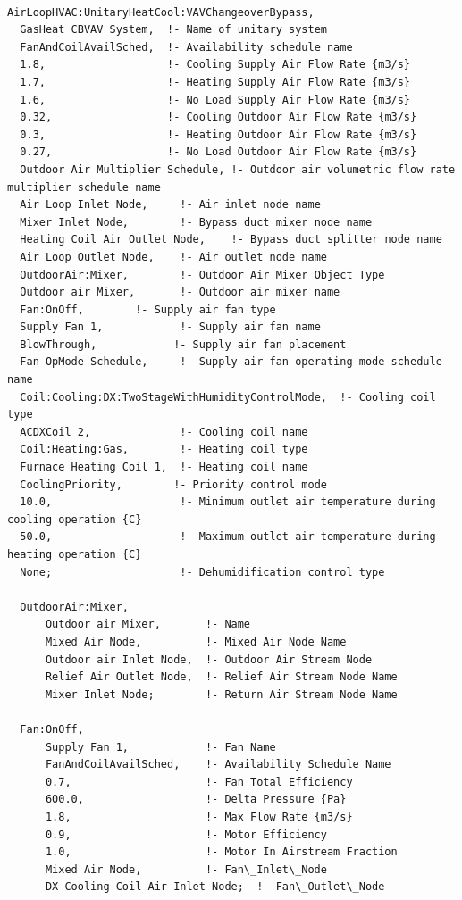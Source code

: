 \begin{lstlisting}

AirLoopHVAC:UnitaryHeatCool:VAVChangeoverBypass,
  GasHeat CBVAV System,  !- Name of unitary system
  FanAndCoilAvailSched,  !- Availability schedule name
  1.8,                   !- Cooling Supply Air Flow Rate {m3/s}
  1.7,                   !- Heating Supply Air Flow Rate {m3/s}
  1.6,                   !- No Load Supply Air Flow Rate {m3/s}
  0.32,                  !- Cooling Outdoor Air Flow Rate {m3/s}
  0.3,                   !- Heating Outdoor Air Flow Rate {m3/s}
  0.27,                  !- No Load Outdoor Air Flow Rate {m3/s}
  Outdoor Air Multiplier Schedule, !- Outdoor air volumetric flow rate multiplier schedule name
  Air Loop Inlet Node,     !- Air inlet node name
  Mixer Inlet Node,        !- Bypass duct mixer node name
  Heating Coil Air Outlet Node,    !- Bypass duct splitter node name
  Air Loop Outlet Node,    !- Air outlet node name
  OutdoorAir:Mixer,        !- Outdoor Air Mixer Object Type
  Outdoor air Mixer,       !- Outdoor air mixer name
  Fan:OnOff,        !- Supply air fan type
  Supply Fan 1,            !- Supply air fan name
  BlowThrough,            !- Supply air fan placement
  Fan OpMode Schedule,     !- Supply air fan operating mode schedule name
  Coil:Cooling:DX:TwoStageWithHumidityControlMode,  !- Cooling coil type
  ACDXCoil 2,              !- Cooling coil name
  Coil:Heating:Gas,        !- Heating coil type
  Furnace Heating Coil 1,  !- Heating coil name
  CoolingPriority,        !- Priority control mode
  10.0,                    !- Minimum outlet air temperature during cooling operation {C}
  50.0,                    !- Maximum outlet air temperature during heating operation {C}
  None;                    !- Dehumidification control type

  OutdoorAir:Mixer,
      Outdoor air Mixer,       !- Name
      Mixed Air Node,          !- Mixed Air Node Name
      Outdoor air Inlet Node,  !- Outdoor Air Stream Node
      Relief Air Outlet Node,  !- Relief Air Stream Node Name
      Mixer Inlet Node;        !- Return Air Stream Node Name

  Fan:OnOff,
      Supply Fan 1,            !- Fan Name
      FanAndCoilAvailSched,    !- Availability Schedule Name
      0.7,                     !- Fan Total Efficiency
      600.0,                   !- Delta Pressure {Pa}
      1.8,                     !- Max Flow Rate {m3/s}
      0.9,                     !- Motor Efficiency
      1.0,                     !- Motor In Airstream Fraction
      Mixed Air Node,          !- Fan\_Inlet\_Node
      DX Cooling Coil Air Inlet Node;  !- Fan\_Outlet\_Node


\end{lstlisting}
